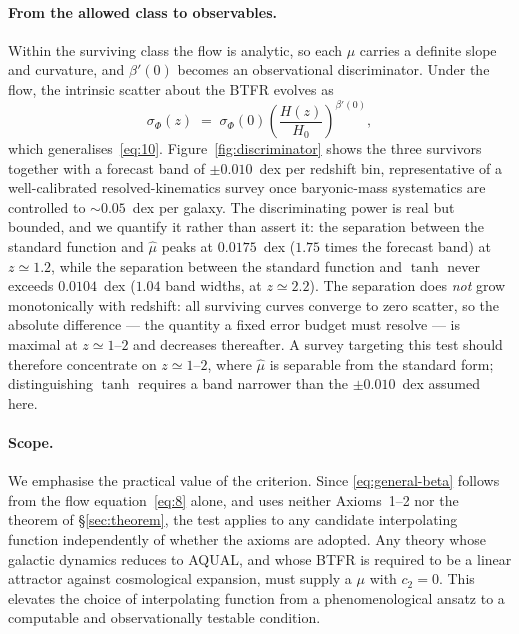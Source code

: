 \documentclass[11pt]{article}
\theoremstyle{plain}
\begin{document}
\paragraph{From the allowed class to observables.} Within the surviving class
the flow is analytic, so each $\mu$ carries a definite slope and curvature, and
$\beta'(0)$ becomes an observational discriminator.
Under the flow, the intrinsic scatter about the BTFR evolves as
\begin{equation*}\tag{16}\label{eq:sigma-evolution}
\sigma_{\Phi}(z) \;=\; \sigma_{\Phi}(0)
   \left(\frac{H(z)}{H_{0}}\right)^{\beta'(0)},
\end{equation*}
which generalises~\eqref{eq:10}. Figure~\ref{fig:discriminator} shows the three
survivors together with a forecast band of $\pm0.010$~dex per redshift bin,
representative of a well-calibrated resolved-kinematics survey once
baryonic-mass systematics are controlled to $\sim0.05$~dex per galaxy. The
discriminating power is real but bounded, and we quantify it rather than assert
it: the separation between the standard function and $\hat\mu$ peaks at
$0.0175$~dex ($1.75$ times the forecast band) at $z\simeq1.2$, while the
separation between the standard function and $\tanh$ never exceeds
$0.0104$~dex ($1.04$ band widths, at $z\simeq2.2$). The separation does
\emph{not} grow monotonically with redshift: all surviving curves converge to
zero scatter, so the absolute difference --- the quantity a fixed error budget
must resolve --- is maximal at $z\simeq1$--$2$ and decreases thereafter. A
survey targeting this test should therefore concentrate on $z\simeq1$--$2$,
where $\hat\mu$ is separable from the standard form; distinguishing $\tanh$
requires a band narrower than the $\pm0.010$~dex assumed here.

\paragraph{Scope.} We emphasise the practical value of the criterion. Since
\eqref{eq:general-beta} follows from the flow equation~\eqref{eq:8} alone, and
uses neither Axioms~1--2 nor the theorem of \S\ref{sec:theorem}, the test
applies to any candidate interpolating function independently of whether the
axioms are adopted. Any theory whose galactic dynamics reduces to AQUAL, and
whose BTFR is required to be a linear attractor against cosmological expansion,
must supply a $\mu$ with $c_{2}=0$. This elevates the choice of interpolating
function from a phenomenological ansatz to a computable and observationally
testable condition.
\end{document}
